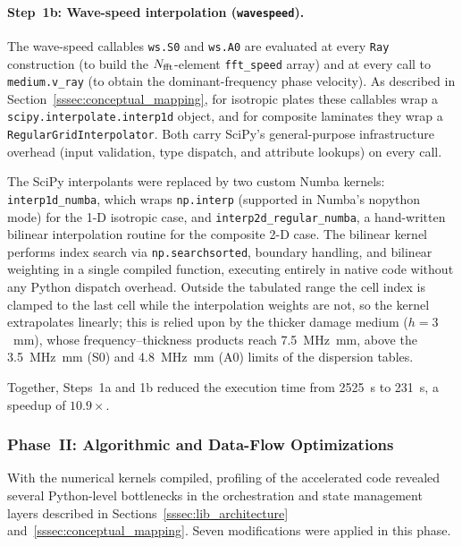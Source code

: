             \paragraph*{Step~1b: Wave-speed interpolation (\texttt{wavespeed}).}
            The wave-speed callables \texttt{ws.S0} and \texttt{ws.A0} are evaluated at every \texttt{Ray} construction (to build the $N_{\rm fft}$-element \texttt{fft\_speed} array) and at every call to \texttt{medium.v\_ray} (to obtain the dominant-frequency phase velocity).  As described in Section~\ref{sssec:conceptual_mapping}, for isotropic plates these callables wrap a \texttt{scipy.interpolate.interp1d} object, and for composite laminates they wrap a \texttt{RegularGridInterpolator}. Both carry SciPy's general-purpose infrastructure overhead (input validation, type dispatch, and attribute lookups) on every call.

            The SciPy interpolants were replaced by two custom Numba kernels: \texttt{interp1d\allowbreak\_numba}, which wraps \texttt{np.interp} (supported in Numba's nopython mode) for the 1-D isotropic case, and \texttt{interp2d\_regular\_numba}, a hand-written bilinear interpolation routine for the composite 2-D case.  The bilinear kernel performs index search via \texttt{np.searchsorted}, boundary handling, and bilinear weighting in a single compiled function, executing entirely in native code without any Python dispatch overhead. Outside the tabulated range the cell index is clamped to the last cell while the interpolation weights are not, so the kernel extrapolates linearly; this is relied upon by the thicker damage medium ($h = 3$~mm), whose frequency--thickness products reach \SI{7.5}{\mega\hertz\milli\metre}, above the \SI{3.5}{\mega\hertz\milli\metre} (S0) and \SI{4.8}{\mega\hertz\milli\metre} (A0) limits of the dispersion tables.

            Together, Steps~1a and 1b reduced the execution time from \SI{2525}{\second} to \SI{231}{\second}, a speedup of $10.9\times$.


        \subsubsection{Phase~II: Algorithmic and Data-Flow Optimizations}
        \label{ssec:opt_algo}

            With the numerical kernels compiled, profiling of the accelerated code revealed several Python-level bottlenecks in the orchestration and state management layers described in Sections~\ref{sssec:lib_architecture} and~\ref{sssec:conceptual_mapping}.  Seven modifications were applied in this phase.

